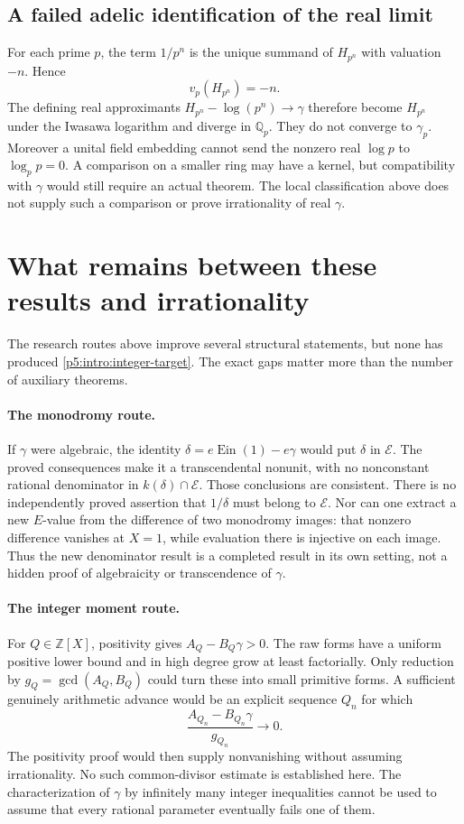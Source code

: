 \documentclass[11pt,a4paper]{article}
\theoremstyle{definition}
\theoremstyle{remark}
\numberwithin{equation}{section}
\begin{document}
\subsection{A failed adelic identification of the real limit}
For each prime $p$, the term $1/p^n$ is the unique summand of
$H_{p^n}$ with valuation $-n$.  Hence
\[
 v_p(H_{p^n})=-n.
\]
The defining real approximants $H_{p^n}-\log(p^n)\to\gamma$
therefore become $H_{p^n}$ under the Iwasawa logarithm and diverge
in $\mathbb Q_p$.  They do not converge to $\gamma_p$.
Moreover a unital field embedding cannot send the nonzero real
$\log p$ to $\log_p p=0$.  A comparison on a smaller ring may
have a kernel, but compatibility with $\gamma$ would still require
an actual theorem.  The local classification above does not
supply such a comparison or prove irrationality of real $\gamma$.

\section{What remains between these results and irrationality}
\label{p5:sec:remaining}

The research routes above improve several structural statements, but
none has produced \eqref{p5:intro:integer-target}. The exact gaps matter
more than the number of auxiliary theorems.

\paragraph{The monodromy route.}
If $\gamma$ were algebraic, the identity
$\delta=e\operatorname{Ein}(1)-e\gamma$ would put $\delta$ in
$\mathcal E$. The proved consequences make it a transcendental
nonunit, with no nonconstant rational denominator in
$k(\delta)\cap\mathcal E$. Those conclusions are consistent.
There is no independently proved assertion that $1/\delta$ must
belong to $\mathcal E$. Nor can one extract a new $E$-value from
the difference of two monodromy images: that nonzero difference
vanishes at $X=1$, while evaluation there is injective on each image.
Thus the new denominator result is a completed result in its own
setting, not a hidden proof of algebraicity or transcendence of
$\gamma$.

\paragraph{The integer moment route.}
For $Q\in\mathbb Z[X]$, positivity gives
$A_Q-B_Q\gamma>0$. The raw forms have a uniform positive lower
bound and in high degree grow at least factorially. Only reduction
by $g_Q=\gcd(A_Q,B_Q)$ could turn these into small primitive forms.
A sufficient genuinely arithmetic advance would be an explicit
sequence $Q_n$ for which
\[
 \frac{A_{Q_n}-B_{Q_n}\gamma}{g_{Q_n}}\longrightarrow0.
\]
The positivity proof would then supply nonvanishing without assuming
irrationality. No such common-divisor estimate is established here.
The characterization of $\gamma$ by infinitely many integer
inequalities cannot be used to assume that every rational parameter
eventually fails one of them.
\end{document}
